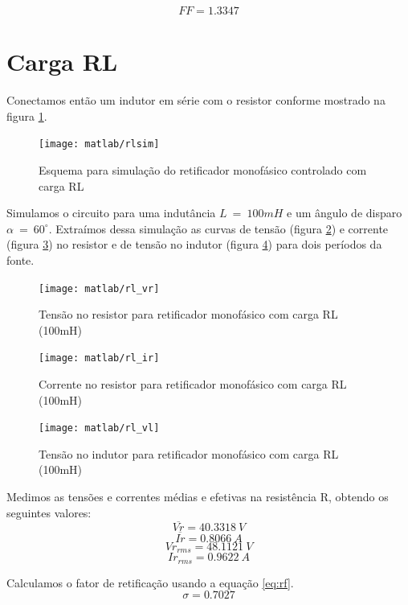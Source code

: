 \documentclass{report}
\begin{document}
\begin{equation}
FF = 1.3347
\end{equation}


\section{Carga RL}
Conectamos então um indutor em série com o resistor conforme mostrado na figura \ref{fig:rlsim}.
\begin{figure}[H]
	\centering
	\texttt{[image: matlab/rlsim]}
	\caption{Esquema para simulação do retificador monofásico controlado com carga RL}
	\label{fig:rlsim}
\end{figure}

Simulamos o circuito para uma indutância $L\ =\ 100mH$ e um ângulo de disparo $\alpha\ =\ 60^\circ$. Extraímos dessa simulação as curvas de tensão (figura \ref{fig:rlvr}) e corrente (figura \ref{fig:rlir}) no resistor e de tensão no indutor (figura \ref{fig:rlvl}) para dois períodos da fonte.
\begin{figure}[H]
	\centering
	\texttt{[image: matlab/rl\_vr]}
	\caption{Tensão no resistor para retificador monofásico com carga RL (100mH)}
	\label{fig:rlvr}
\end{figure}
\begin{figure}[H]
	\centering
	\texttt{[image: matlab/rl\_ir]}
	\caption{Corrente no resistor para retificador monofásico com carga RL (100mH)}
	\label{fig:rlir}
\end{figure}
\begin{figure}[H]
	\centering
	\texttt{[image: matlab/rl\_vl]}
	\caption{Tensão no indutor para retificador monofásico com carga RL (100mH)}
	\label{fig:rlvl}
\end{figure}
Medimos as tensões e correntes médias e efetivas na resistência R, obtendo os seguintes valores:
\begin{equation}
\overline{Vr} = 40.3318\ V
\end{equation}
\begin{equation}
\overline{Ir} =  0.8066\ A
\end{equation}
\begin{equation}
Vr_{rms} =  48.1121\ V
\end{equation}
\begin{equation}
Ir_{rms} =   0.9622\ A
\end{equation}

Calculamos o fator de retificação usando a equação \ref{eq:rf}.
\begin{equation}
\sigma = 0.7027
\end{equation}
\end{document}
